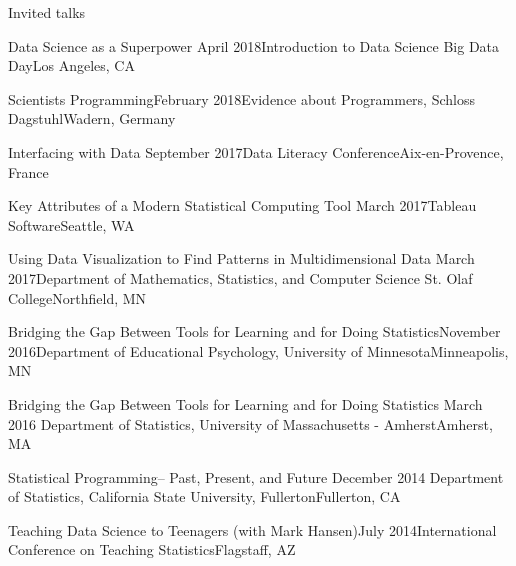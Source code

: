 \documentclass{resume} %
\begin{document}
\begin{rSection}{Invited talks}
\begin{sSubsection}{Data Science as a Superpower}{ }{April 2018}{Introduction to Data Science Big Data Day}{Los Angeles, CA}
\end{sSubsection}

\begin{sSubsection}{Scientists Programming}{}{February 2018}{Evidence about Programmers, Schloss Dagstuhl}{Wadern, Germany}
\end{sSubsection}

\begin{sSubsection}{Interfacing with Data}{ }{September 2017}{Data Literacy Conference}{Aix-en-Provence, France}
\end{sSubsection}

\begin{sSubsection}{Key Attributes of a Modern Statistical Computing Tool}{ }{March 2017}{Tableau Software}{Seattle, WA}
\end{sSubsection}

\begin{sSubsection}{Using Data Visualization to Find Patterns in Multidimensional Data}{ }{March 2017}{Department of Mathematics, Statistics, and Computer Science St. Olaf College}{Northfield, MN}
\end{sSubsection}

\begin{sSubsection}{Bridging the Gap Between Tools for Learning and for Doing Statistics}{}{November 2016}{Department of Educational Psychology, University of Minnesota}{Minneapolis, MN}
\end{sSubsection}

\begin{sSubsection}{Bridging the Gap Between Tools for Learning and for Doing Statistics}{ }{March 2016 }{Department of Statistics, University of Massachusetts - Amherst}{Amherst, MA}
\end{sSubsection}

\begin{sSubsection}{Statistical Programming-- Past, Present, and Future}{ }{December 2014 }{Department of Statistics, California State University, Fullerton}{Fullerton, CA}
\end{sSubsection}

\begin{sSubsection}{Teaching Data Science to Teenagers}{ (with Mark Hansen)}{July 2014}{International Conference on Teaching Statistics}{Flagstaff, AZ}
\end{sSubsection}


\end{rSection}
\end{document}
